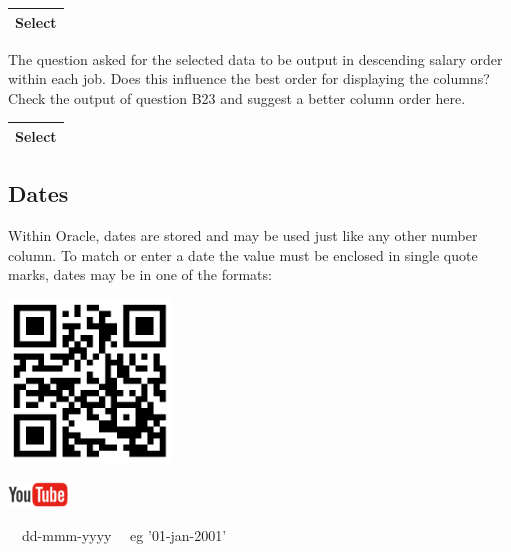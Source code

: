 \begin{flushleft}
\tablefirsthead{}
\tablehead{}
\tabletail{}
\tablelasttail{}
\begin{supertabular}{|m{14.303cm}|}
\hline
Select 

\\\hline
\end{supertabular}
\end{flushleft}
The question asked for the selected data to be output in descending salary order within each job.  Does this influence the best order for displaying the columns?  Check the output of question B23 and suggest a better column order here.

\begin{flushleft}
\tablefirsthead{}
\tablehead{}
\tabletail{}
\tablelasttail{}
\begin{supertabular}{|m{14.303cm}|}
\hline
Select 

\\\hline
\end{supertabular}
\end{flushleft}
\subsection{}
\subsection{Dates}
Within Oracle, dates are stored and may be used just like any other number column.  To match or enter a date the value must be enclosed in single quote marks, dates may be in one of the formats:

\begin{center}
\begin{minipage}{4.849cm}
   
\includegraphics[width=4.341cm,height=4.341cm]{images/img (30).png}
 

   
\includegraphics[width=1.582cm,height=0.674cm]{images/img (15).png}
 
\end{minipage}
\end{center}
\ \ dd-mmm-yyyy  \ \ eg  {}'01-jan-2001'

